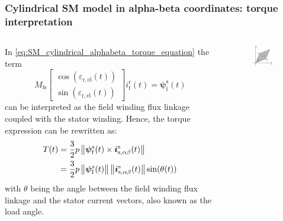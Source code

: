 \begin{frame}
	\frametitle{Cylindrical SM model in alpha-beta coordinates: torque interpretation}
    \begin{columns}
		\begin{column}{0.55\textwidth}
			\onslide<+->
			In \eqref{eq:SM_cylindrical_alphabeta_torque_equation} the term
			\begin{equation}
				M_\mathrm{fs} \begin{bmatrix}\cos(\varepsilon_\mathrm{r,el}(t))\\ \sin(\varepsilon_\mathrm{r,el}(t))\end{bmatrix} i^\mathrm{r}_{\mathrm{f}}(t) =\bm{\psi}^\mathrm{s}_{\mathrm{f}}(t)
			\end{equation}
			can be interpreted as the field winding flux linkage coupled with the stator winding. \onslide<+-> Hence, the torque expression can be rewritten as:
			\begin{equation}
				\begin{split}
				T(t) &= \frac{3}{2} p \left\|\bm{\psi}^\mathrm{s}_{\mathrm{f}}(t) \times \bm{i}^\mathrm{s}_{\mathrm{s,\alpha\beta}}(t)\right\| \\ &= \frac{3}{2} p \left\|\bm{\psi}^\mathrm{s}_{\mathrm{f}}(t) \vphantom{\bm{i}^\mathrm{s}_{\mathrm{s,\alpha\beta}}(t)}\right\| \left\| \bm{i}^\mathrm{s}_{\mathrm{s,\alpha\beta}}(t)\right\| \sin(\theta(t))
			\end{split}
			\end{equation}
			with $\theta$ being the angle between the field winding flux linkage and the stator current vectors, also known as the load angle.
        \end{column}
        \begin{column}{0.45\textwidth}
            \begin{figure}
                \centering
                \includegraphics[width=0.75\textwidth]{fig/lec07/Torque_interpretation.pdf}

\end{figure}
\end{column}
\end{columns}
\end{frame}
